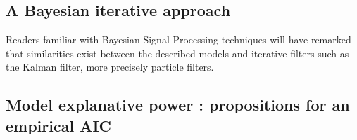 \subsection{A Bayesian iterative approach}

Readers familiar with Bayesian Signal Processing techniques will have remarked that similarities exist between the described models and iterative filters such as the Kalman filter, more precisely particle filters.



\subsection{Model explanative power : propositions for an empirical AIC}










